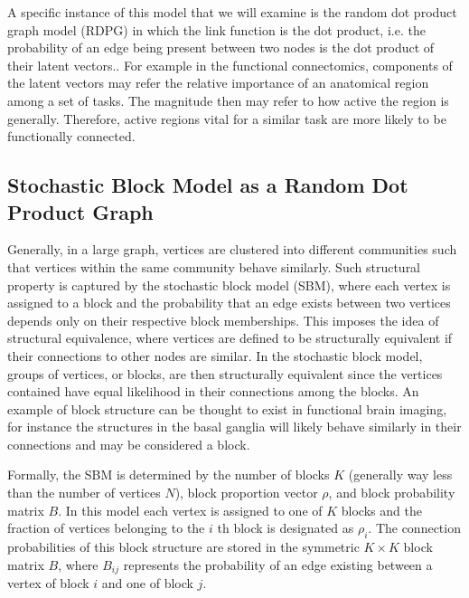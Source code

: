 A specific instance of this model that we will examine is the random dot product graph model (RDPG) in which the link function is the dot product, i.e. the probability of an edge being present between two nodes is the dot product of their latent vectors.\cite{Schein}. For example in the functional connectomics, components of the latent vectors may refer the relative importance of an anatomical region among a set of tasks.  The magnitude then may refer to how active the region is generally.  Therefore, active regions vital for a similar task are more likely to be functionally connected.

\subsection{Stochastic Block Model as a Random Dot Product Graph}
Generally, in a large graph, vertices are clustered into different communities such that vertices within the same community behave similarly. Such structural property is captured by the stochastic block model (SBM), where each vertex is assigned to a block and the probability that an edge exists between two vertices depends only on their respective block memberships. This imposes the idea of structural equivalence, where vertices are defined to be structurally equivalent if their connections to other nodes are similar.  In the stochastic block model, groups of vertices, or blocks, are then structurally equivalent since the vertices contained have equal likelihood in their connections among the blocks.  An example of block structure can be thought to exist in functional brain imaging, for instance the structures in the basal ganglia will likely behave similarly in their connections and may be considered a block.

Formally, the SBM is determined by the number of blocks $K$ (generally way less than the number of vertices $N$), block proportion vector $\rho$, and block probability matrix $B$. In this model each vertex is assigned to one of $K$ blocks and the fraction of vertices belonging to the $i$ th block is designated as $\rho_i$.  The connection probabilities of this block structure are stored in the symmetric $K \times K$ block matrix $B$, where $B_{ij}$ represents the probability of an edge existing between a vertex of block $i$ and one of block $j$.

